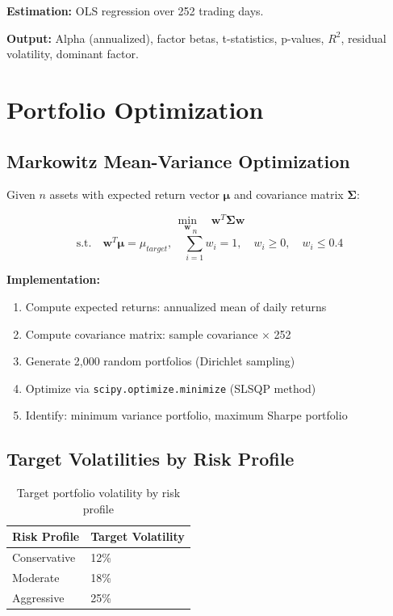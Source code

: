 \documentclass[12pt, a4paper, oneside]{report}
\begin{document}
\textbf{Estimation:} OLS regression over 252 trading days.

\textbf{Output:} Alpha (annualized), factor betas, t-statistics, p-values, $R^2$, residual volatility, dominant factor.

\section{Portfolio Optimization}
\label{sec:meth_portfolio}

\subsection{Markowitz Mean-Variance Optimization}

Given $n$ assets with expected return vector $\boldsymbol{\mu}$ and covariance matrix $\boldsymbol{\Sigma}$:

\begin{equation}
    \min_{\mathbf{w}} \quad \mathbf{w}^T \boldsymbol{\Sigma} \mathbf{w}
\end{equation}
\begin{equation}
    \text{s.t.} \quad \mathbf{w}^T \boldsymbol{\mu} = \mu_{target}, \quad \sum_{i=1}^{n} w_i = 1, \quad w_i \geq 0, \quad w_i \leq 0.4
\end{equation}

\textbf{Implementation:}
\begin{enumerate}[nosep]
    \item Compute expected returns: annualized mean of daily returns
    \item Compute covariance matrix: sample covariance $\times$ 252
    \item Generate 2,000 random portfolios (Dirichlet sampling)
    \item Optimize via \texttt{scipy.optimize.minimize} (SLSQP method)
    \item Identify: minimum variance portfolio, maximum Sharpe portfolio
\end{enumerate}

\subsection{Target Volatilities by Risk Profile}

\begin{table}[H]
\centering
\caption{Target portfolio volatility by risk profile}
\label{tab:target_vol}
\begin{tabular}{@{}ll@{}}
\toprule
\textbf{Risk Profile} & \textbf{Target Volatility} \\
\midrule
Conservative & 12\% \\
Moderate & 18\% \\
Aggressive & 25\% \\
\bottomrule
\end{tabular}
\end{table}
\end{document}
